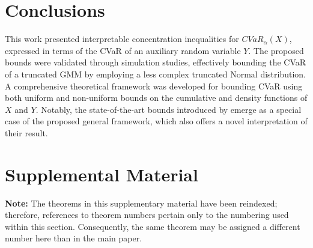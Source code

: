 \documentclass[letterpaper]{article} %
\begin{document}
\section{Conclusions}
This work presented interpretable concentration inequalities for $CVaR_\alpha(X)$, expressed in terms of the CVaR of an auxiliary random variable $Y$. The proposed bounds were validated through simulation studies, effectively bounding the CVaR of a truncated GMM by employing a less complex truncated Normal distribution. A comprehensive theoretical framework was developed for bounding CVaR using both uniform and non-uniform bounds on the cumulative and density functions of $X$ and $Y$. Notably, the state-of-the-art bounds introduced by \cite{pmlr-v97-thomas19a} emerge as a special case of the proposed general framework, which also offers a novel interpretation of their result. 



\section{Supplemental Material}

\textbf{Note:} The theorems in this supplementary material have been reindexed; therefore, references to theorem numbers pertain only to the numbering used within this section. Consequently, the same theorem may be assigned a different number here than in the main paper.
\end{document}

